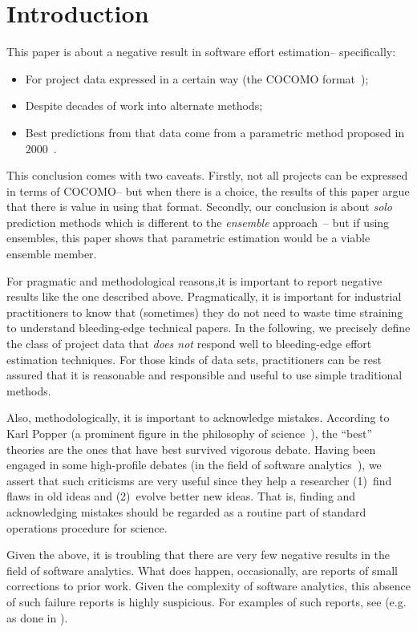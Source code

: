 \documentclass[smallcondesed]{svjour3}
\newcommand{\bi}{\begin{itemize}[leftmargin=0.4cm]}
\newcommand{\ei}{\end{itemize}}
\newenvironment{BLUE}{\color{blue}}{\ignorespacesafterend}
\newcommand{\HERE}[1]{\label{err:#1}
 \reversemarginpar\marginnote{\textcolor{blue}{(#1)}}}
\begin{document}
\newpage
\section{Introduction}
This paper is about a negative result in software effort estimation-- specifically:
\bi
\item
For project data
expressed in a certain
way (the COCOMO format~\cite{boehm00b});
\item
Despite decades of work into 
alternate methods;
\item
Best predictions  from that data
come from a parametric  method proposed in 2000~\cite{boehm00b}.\ei
This conclusion comes with two
caveats. 
  Firstly, not all projects can be expressed in terms of COCOMO--
  but when there is a choice, the results
  of this paper argue that there is
  value in using that format.
Secondly, our conclusion is about {\em solo} prediction methods which is different to the  
{\em ensemble} approach~\cite{Minku2011,Minku2013,koc11a,Minku16b}-- but if using ensembles, this paper shows that parametric estimation would be   a viable  
 ensemble member.

For pragmatic and methodological reasons,it is important to report   negative results like the one described above. Pragmatically, it is important
for industrial practitioners to know that (sometimes) they do not need to waste time straining to understand  bleeding-edge technical papers. In the following, we precisely define the class of project data that {\em does not} respond well to  bleeding-edge 
effort estimation techniques.
For those kinds of data sets,   practitioners can be rest assured that it is reasonable and responsible and useful to use simple
traditional methods.

Also, methodologically, it is important to acknowledge mistakes. According to 
 Karl Popper (a prominent figure in the philosophy of science~\cite{popper63}), the ``best'' theories are  the ones that have best survived vigorous debate.  Having been engaged in some
 high-profile debates (in the field
of software analytics~\cite{me07e}), we assert that such criticisms are very  useful
since they help a researcher (1)~find flaws in old ideas and (2)~evolve better
new ideas. That is, finding and acknowledging mistakes should be regarded as a routine part of
standard operations procedure for science. 


 
\begin{BLUE}\HERE{Reviewer1a} 
Given the above, it is troubling  that 
there are very few negative results   in the field of software analytics. 
What does happen, occasionally,  are  reports of small
corrections to prior work. Given the complexity of software analytics, this absence of such failure reports is highly suspicious. For examples of such reports, see (e.g. as done in \cite{menzies13err,Murphy-Hill2012}).
\end{BLUE}
\end{document}
